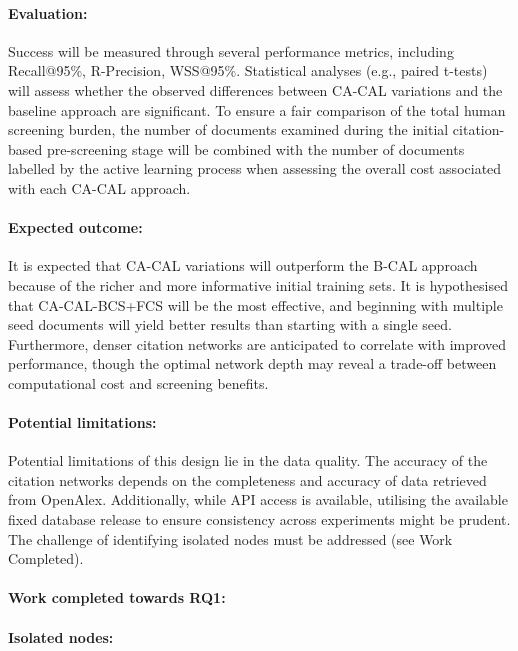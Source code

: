 \documentclass[10pt,oneside]{book}
\begin{document}
\paragraph{Evaluation: } Success will be measured through several performance metrics, including Recall@95\%, R-Precision, WSS@95\%. Statistical analyses (e.g., paired t-tests) will assess whether the observed differences between CA-CAL variations and the baseline approach are significant. To ensure a fair comparison of the total human screening burden, the number of documents examined during the initial citation-based pre-screening stage will be combined with the number of documents labelled by the active learning process when assessing the overall cost associated with each CA-CAL approach.

\paragraph{Expected outcome: } It is expected that CA-CAL variations will outperform the B-CAL approach because of the richer and more informative initial training sets. It is hypothesised that CA-CAL-BCS+FCS will be the most effective, and beginning with multiple seed documents will yield better results than starting with a single seed. Furthermore, denser citation networks are anticipated to correlate with improved performance, though the optimal network depth may reveal a trade-off between computational cost and screening benefits.


\paragraph{Potential limitations: } Potential limitations of this design lie in the data quality. The accuracy of the citation networks depends on the completeness and accuracy of data retrieved from OpenAlex. Additionally, while API access is available, utilising the available fixed database release to ensure consistency across experiments might be prudent. The challenge of identifying isolated nodes must be addressed (see Work Completed).

\paragraph{Work completed towards RQ1:}

\paragraph{Isolated nodes:}
\end{document}
